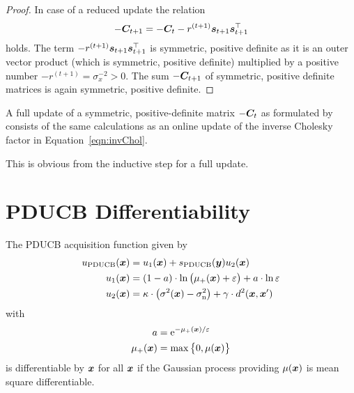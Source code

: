 \begin{proof}
    In case of a reduced update the relation
    \begin{equation*}
        -\bm{C}_{t+1} = -\bm{C}_t - r^{(t+1)} \bm{s}_{t+1} \bm{s}_{t+1}^{\top}
    \end{equation*}
    holds. The term $- r^{(t+1)} \bm{s}_{t+1} \bm{s}_{t+1}^{\top}$ is symmetric, 
    positive definite as it is an outer vector product (which is symmetric, 
    positive definite) multiplied by a positive number $-r^{(t+1)} 
    = \sigma_x^{-2} > 0$. The sum $-\bm{C}_{t+1}$ of symmetric, positive 
    definite matrices is again symmetric, positive definite.
\end{proof}

\begin{corollary}
    A full update of a symmetric, positive-definite matrix $-\bm{C}_t$ as 
    formulated by \textcite[equation~2.9]{Csato:2002fp} consists of the same 
    calculations as an online update of the inverse Cholesky factor in 
    Equation~\ref{eqn:invChol}.
\end{corollary}
This is obvious from the inductive step for a full update.

\chapter{PDUCB Differentiability}\label{sec:pducb-diff}
\begin{theorem}
    The PDUCB acquisition function given by
    \begin{align*}
    u\ped{PDUCB}(\vc x) &= u_1(\vc x) + s\ped{PDUCB}(\vc y) u_2(\vc x) \\
    u_1(\vc x) &= \del{1 - a} \cdot \ln\del{\mu_+(\vc x) + \varepsilon} 
    + a \cdot \ln \varepsilon \\
    u_2(\vc x) &= \kappa \cdot \del[1]{\sigma^2(\vc x) - \sigma\ped{n}^2} 
    + \gamma \cdot d^2(\vc x, \vc x')
    \end{align*}
    with
    \begin{align*}
    a &= \e^{-\mu_+(\vc x) / \varepsilon} \\
    \mu_+(\vc x) &= \max\cbr{0, \mu(\vc x)}
    \end{align*}
    is differentiable by $\bm{x}$ for all $\bm{x}$ if the Gaussian process 
    providing $\mu(\bm{x})$ is mean square differentiable.
\end{theorem}

